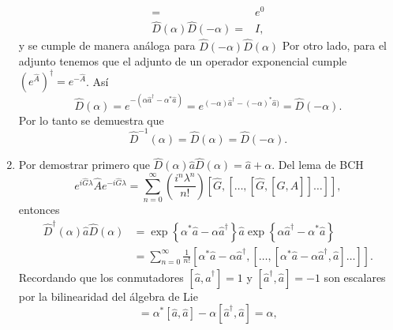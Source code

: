 \begin{enumerate}
\begin{align}
          =                                  & e^{0}                                                                                                                                                                                                                                                \nonumber \\
          \hat{D}(\alpha) \hat{D}(-\alpha) = & I,
        \end{align}
        y se cumple de manera análoga para $\hat{D}(-\alpha)\hat{D}(\alpha)$
        Por otro lado, para el adjunto tenemos que el adjunto de un operador exponencial cumple $\left(e^{\hat{A}}\right)^{\dagger} = e^{-\hat{A}}$. Así
        \begin{equation}
          \hat{D}(\alpha) = e^{-(\alpha \hat{a}^{\dagger} - \alpha^{*}\hat{a})} = e^{(-\alpha) \hat{a}^{\dagger} - (-\alpha)^{*}\hat{a})} = \hat{D}(-\alpha).
        \end{equation}
        Por lo tanto se demuestra que
        \begin{equation}
          \hat{D}^{-1}(\alpha) = \hat{D}(\alpha) = \hat{D}(-\alpha).
        \end{equation}
  \item Por demostrar primero que $\hat{D}(\alpha)\hat{a}\hat{D}(\alpha) = \hat{a} + \alpha$. Del lema de BCH \cite{Sakurai}
        \begin{equation}
          e^{i\hat{G}\lambda}\hat{A}e^{-i\hat{G}\lambda} = \sum_{n=0}^{\infty} \left( \frac{i^n \lambda^n}{n!} \right)[\hat{G},[\dots,[\hat{G}, [\hat{G},\hat{A}]]\dots]],
        \end{equation}
        entonces
        \begin{align}
          \hat{D}^{\dagger}(\alpha) \hat{a} \hat{D}(\alpha) & = \exp{\left\{ \alpha^{*}\hat{a} - \alpha \hat{a}^{\dagger} \right\}} \hat{a} \exp{\left\{ \alpha\hat{a}^{\dagger} - \alpha^{*}\hat{a} \right\}}      \nonumber \\
                                                            & = \sum_{n=0}^{\infty} \frac{1}{n!}[\alpha^{*}\hat{a} -\alpha \hat{a}^{\dagger}, [\dots,[\alpha^{*}\hat{a} - \alpha \hat{a}^{\dagger}, \hat{a}]\dots]].
        \end{align}
        Recordando que los conmutadores $[\hat{a}, \hat{a}^{\dagger}] = 1$ y $[\hat{a}^{\dagger}, \hat{a}] = -1$ son escalares
        por la bilinearidad del álgebra de Lie
        \begin{equation}
          [\alpha^{*}\hat{a} - \alpha\hat{a}^{\dagger},\hat{a}] = \alpha^{*}[\hat{a}, \hat{a}] - \alpha[\hat{a}^{\dagger}, \hat{a}] = \alpha,

\end{equation}
\end{enumerate}
